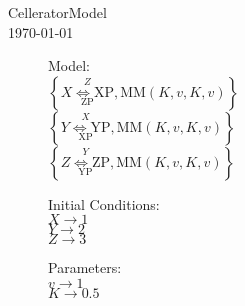 \documentclass[12pt,letterpaper]{article}
\begin{document}
\begin{center}CelleratorModel
\\\today
\end{center}\begin{description}
\item[]Model:\\
$\left\{\underset{\text{ZP}}{\overset{Z}{X\Longleftrightarrow \text{XP}}},\text{MM}(K,v,K,v)\right\}$\\
$\left\{\underset{\text{XP}}{\overset{X}{Y\Longleftrightarrow \text{YP}}},\text{MM}(K,v,K,v)\right\}$\\
$\left\{\underset{\text{YP}}{\overset{Y}{Z\Longleftrightarrow \text{ZP}}},\text{MM}(K,v,K,v)\right\}$\\
\item[]Initial Conditions:\\
$X\to 1$\\
$Y\to 2$\\
$Z\to 3$\\
\item[]Parameters:\\
$v\to 1$\\
$K\to 0.5$\\

\end{description}
\end{document}

